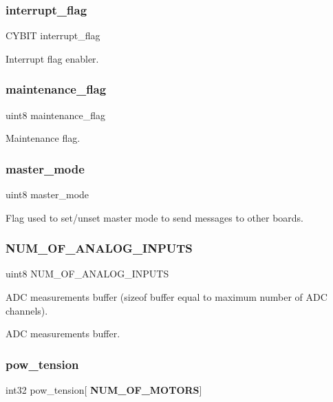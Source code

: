 \subsubsection{interrupt\+\_\+flag}
{\footnotesize\ttfamily C\+Y\+B\+IT interrupt\+\_\+flag}

Interrupt flag enabler. \mbox{\label{globals_8h_a7bdd0aaa2a8c38bd61f34d76d3a69dbf}} 
\subsubsection{maintenance\+\_\+flag}
{\footnotesize\ttfamily uint8 maintenance\+\_\+flag}

Maintenance flag. \mbox{\label{globals_8h_acf0e2a5d5954714103e295ac35513215}} 
\subsubsection{master\+\_\+mode}
{\footnotesize\ttfamily uint8 master\+\_\+mode}

Flag used to set/unset master mode to send messages to other boards. \mbox{\label{globals_8h_ab302ef69391ec5a0b59dadb9c7d2a3ef}} 
\subsubsection{N\+U\+M\+\_\+\+O\+F\+\_\+\+A\+N\+A\+L\+O\+G\+\_\+\+I\+N\+P\+U\+TS}
{\footnotesize\ttfamily uint8 N\+U\+M\+\_\+\+O\+F\+\_\+\+A\+N\+A\+L\+O\+G\+\_\+\+I\+N\+P\+U\+TS}

A\+DC measurements buffer (sizeof buffer equal to maximum number of A\+DC channels).

A\+DC measurements buffer. \mbox{\label{globals_8h_a1c717f431f1d1ea4a500f6027102d001}} 
\subsubsection{pow\+\_\+tension}
{\footnotesize\ttfamily int32 pow\+\_\+tension[\textbf{ N\+U\+M\+\_\+\+O\+F\+\_\+\+M\+O\+T\+O\+RS}]}

